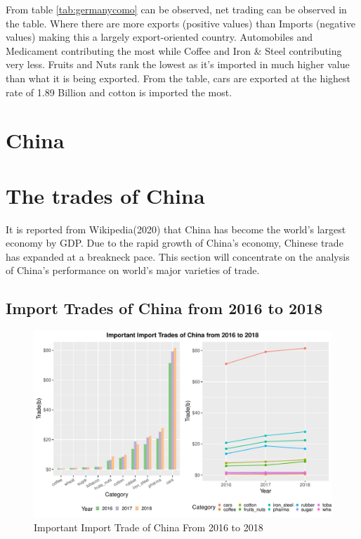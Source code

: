 \documentclass[11pt,a4paper,]{article}
\begin{document}
From table \ref{tab:germanycomo} can be observed, net trading can be observed in the table. Where there are more exports (positive values) than Imports (negative values) making this a largely export-oriented country. Automobiles and Medicament contributing the most while Coffee and Iron \& Steel contributing very less. Fruits and Nuts rank the lowest as it's imported in much higher value than what it is being exported.
From the table, cars are exported at the highest rate of 1.89 Billion and cotton is imported the most.

\section*{China}

\hypertarget{the-trades-of-china}{%
\section{The trades of China}\label{the-trades-of-china}}

It is reported from Wikipedia(2020) that China has become the world's largest economy by GDP. Due to the rapid growth of China's economy, Chinese trade has expanded at a breakneck pace. This section will concentrate on the analysis of China's performance on world's major varieties of trade.

\hypertarget{import-trades-of-china-from-2016-to-2018}{%
\subsection{Import Trades of China from 2016 to 2018}\label{import-trades-of-china-from-2016-to-2018}}

\begin{figure}[H]
\includegraphics[width=1\linewidth,]{report_files/figure-latex/Yuweiplot1-1} \caption{Important Import Trade of China From 2016 to 2018}\label{fig:Yuweiplot1}
\end{figure}
\end{document}
